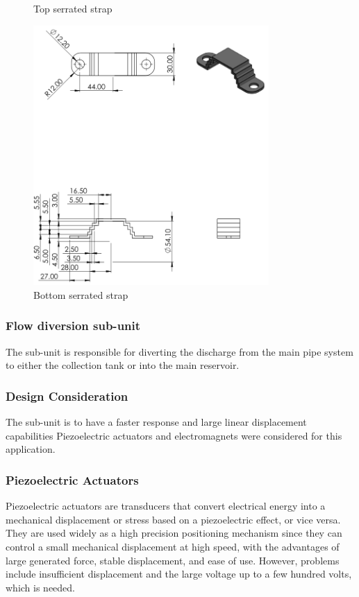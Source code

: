 \begin{enumerate}
\begin{figure}[p]
        \caption{Top serrated strap}
        \includegraphics[width=0.8\textwidth,height=0.5\textheight]{Figures/ss33.PNG}
        \caption{Bottom serrated strap}
        \label{fig:top_n_bottom_straps}
    \end{figure}
\end{enumerate}
\par
 
\subsubsection{Flow diversion sub-unit}
\par
The sub-unit is responsible for diverting the discharge from the main pipe system to either the collection tank or into the main reservoir.
\subsubsection{Design Consideration}
The sub-unit is to have a faster response and large linear displacement capabilities Piezoelectric actuators and electromagnets were considered for this application.
\subsubsection{Piezoelectric Actuators}
Piezoelectric actuators are transducers that convert electrical energy into a mechanical displacement or stress based on a piezoelectric effect, or vice versa. They are used widely as a high precision positioning mechanism since they can control a small mechanical displacement at high speed, with the advantages of large generated force, stable displacement, and ease of use\cite{gao2020piezoelectric}. However, problems include insufficient displacement and the large voltage up to a few hundred volts, which is needed.
